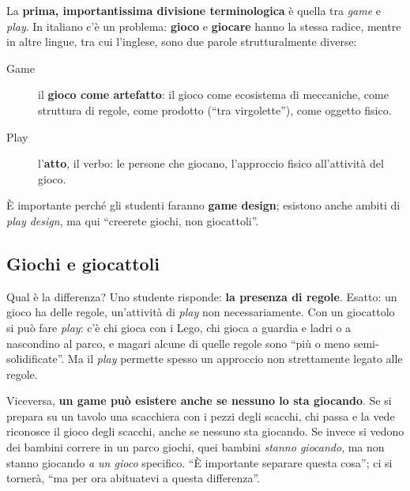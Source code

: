 La \textbf{prima, importantissima divisione terminologica} è quella tra
\emph{game} e \emph{play}. In italiano c'è un problema: \textbf{gioco} e
\textbf{giocare} hanno la stessa radice, mentre in altre lingue, tra cui
l'inglese, sono due parole strutturalmente diverse:
\begin{description}
  \item[Game] il \textbf{gioco come artefatto}: il gioco come ecosistema di
        meccaniche, come struttura di regole, come prodotto (``tra
        virgolette''), come oggetto fisico.
  \item[Play] l'\textbf{atto}, il verbo: le persone che giocano, l'approccio
        fisico all'attività del gioco.
\end{description}
È importante perché gli studenti faranno \textbf{game design}; esistono anche
ambiti di \emph{play design}, ma qui ``creerete giochi, non giocattoli''.

\subsection{Giochi e giocattoli}

Qual è la differenza? Uno studente risponde: \textbf{la presenza di regole}.
Esatto: un gioco ha delle regole, un'attività di \emph{play} non
necessariamente. Con un giocattolo si può fare \emph{play}: c'è chi gioca con i
Lego, chi gioca a guardia e ladri o a nascondino al parco, e magari alcune di
quelle regole sono ``più o meno semi-solidificate''. Ma il \emph{play} permette
spesso un approccio non strettamente legato alle regole.

Viceversa, \textbf{un game può esistere anche se nessuno lo sta giocando}. Se si
prepara su un tavolo una scacchiera con i pezzi degli scacchi, chi passa e la
vede riconosce il gioco degli scacchi, anche se nessuno sta giocando. Se invece
si vedono dei bambini correre in un parco giochi, quei bambini \emph{stanno
giocando}, ma non stanno giocando \emph{a un gioco} specifico. ``È importante
separare questa cosa''; ci si tornerà, ``ma per ora abituatevi a questa
differenza''.

